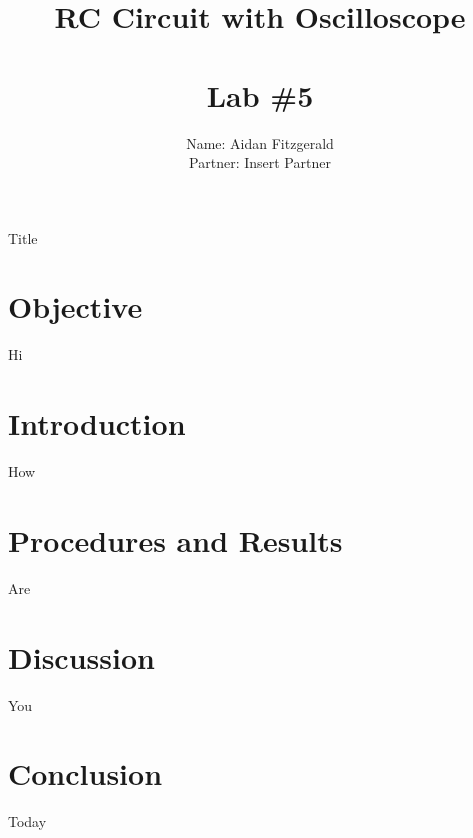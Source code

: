 \documentclass[11pt, titlepage, letterpaper, twoside]{article}
\title{\textbf{RC Circuit with Oscilloscope} \\ \ \\ \large Lab \#5 }
\author{Name: Aidan Fitzgerald \\ Partner: Insert Partner}
\date{}
\begin{document}
\maketitle

\begin{center}
\LARGE Title
\end{center}

\section*{Objective}
Hi

\section{Introduction}
How

\section{Procedures and Results}
Are

\section{Discussion}
You

\section{Conclusion}
Today
\end{document}
